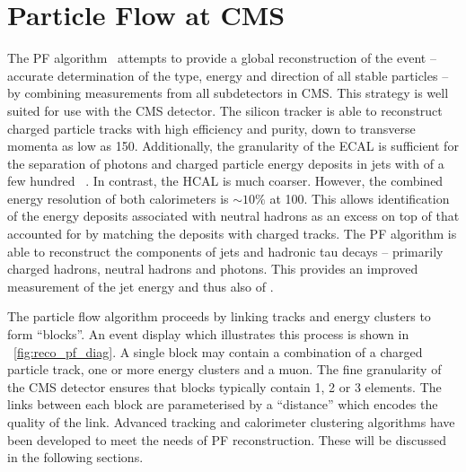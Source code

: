 \section{Particle Flow at \acs{CMS}}
\label{sec:reco_pf}
The \ac{PF} algorithm~\cite{cms_pf_pas,cms_pf_pas2} attempts to provide a
global reconstruction of the event -- accurate determination of the type, energy
and direction of all stable particles -- by combining measurements from all
subdetectors in \ac{CMS}. This strategy is well suited for use with the \ac{CMS}
detector. The silicon tracker is able to reconstruct charged particle tracks
with high efficiency and purity, down to transverse momenta as low as
\unit{150}{\MeV}. Additionally, the granularity of the \ac{ECAL} is sufficient
for the separation of photons and charged particle energy deposits in jets with
\Pt of a few hundred \GeV~\cite{cms_pf_pas}. In contrast, the \ac{HCAL} is much
coarser. However, the combined energy resolution of both calorimeters is $\sim
10\%$ at \unit{100}{\GeV}. This allows identification of the energy deposits
associated with neutral hadrons as an excess on top of that accounted for by
matching the deposits with charged tracks. The \ac{PF} algorithm is able to
reconstruct the components of jets and hadronic tau decays -- primarily charged
hadrons, neutral hadrons and photons. This provides an improved measurement of
the jet energy and thus also of \METv.

The particle flow algorithm proceeds by linking tracks and energy clusters to
form ``blocks''. An event display which illustrates this process is shown in
\fig~\ref{fig:reco_pf_diag}. A single block may contain a combination of a
charged particle track, one or more energy clusters and a muon. The fine
granularity of the \ac{CMS} detector ensures that blocks typically contain 1, 2
or 3 elements.  The links between each block are parameterised by a ``distance''
which encodes the quality of the link. Advanced tracking and calorimeter
clustering algorithms have been developed to meet the needs of \ac{PF}
reconstruction. These will be discussed in the following sections.

